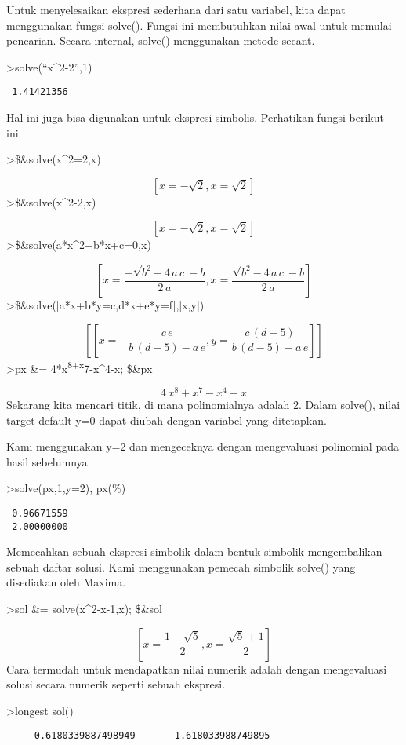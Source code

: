 \documentclass[
]{book}
\begin{document}
Untuk menyelesaikan ekspresi sederhana dari satu variabel, kita dapat menggunakan fungsi solve(). Fungsi ini membutuhkan nilai awal untuk memulai pencarian. Secara internal, solve() menggunakan metode secant.

\textgreater solve(``x\^{}2-2'',1)

\begin{verbatim}
 1.41421356 
\end{verbatim}

Hal ini juga bisa digunakan untuk ekspresi simbolis. Perhatikan fungsi berikut ini.

\textgreater\$\&solve(x\^{}2=2,x)

\[\left[ x=-\sqrt{2} , x=\sqrt{2} \right] \]\textgreater\$\&solve(x\^{}2-2,x)

\[\left[ x=-\sqrt{2} , x=\sqrt{2} \right] \]\textgreater\$\&solve(a*x\^{}2+b*x+c=0,x)

\[\left[ x=\frac{-\sqrt{b^2-4\,a\,c}-b}{2\,a} , x=\frac{\sqrt{b^2-4\,
 a\,c}-b}{2\,a} \right] \]\textgreater\$\&solve({[}a*x+b*y=c,d*x+e*y=f{]},{[}x,y{]})

\[\left[ \left[ x=-\frac{c\,e}{b\,\left(d-5\right)-a\,e} , y=\frac{c
 \,\left(d-5\right)}{b\,\left(d-5\right)-a\,e} \right]  \right] \]\textgreater px \&= 4*x\textsuperscript{8+x}7-x\^{}4-x; \$\&px

\[4\,x^8+x^7-x^4-x\]Sekarang kita mencari titik, di mana polinomialnya adalah 2. Dalam solve(), nilai target default y=0 dapat diubah dengan variabel yang ditetapkan.

Kami menggunakan y=2 dan mengeceknya dengan mengevaluasi polinomial pada hasil sebelumnya.

\textgreater solve(px,1,y=2), px(\%)

\begin{verbatim}
 0.96671559 
 2.00000000 
\end{verbatim}

Memecahkan sebuah ekspresi simbolik dalam bentuk simbolik mengembalikan sebuah daftar solusi. Kami menggunakan pemecah simbolik solve() yang disediakan oleh Maxima.

\textgreater sol \&= solve(x\^{}2-x-1,x); \$\&sol

\[\left[ x=\frac{1-\sqrt{5}}{2} , x=\frac{\sqrt{5}+1}{2} \right] \]Cara termudah untuk mendapatkan nilai numerik adalah dengan mengevaluasi solusi secara numerik seperti sebuah ekspresi.

\textgreater longest sol()

\begin{verbatim}
    -0.6180339887498949       1.618033988749895 
\end{verbatim}
\end{document}
